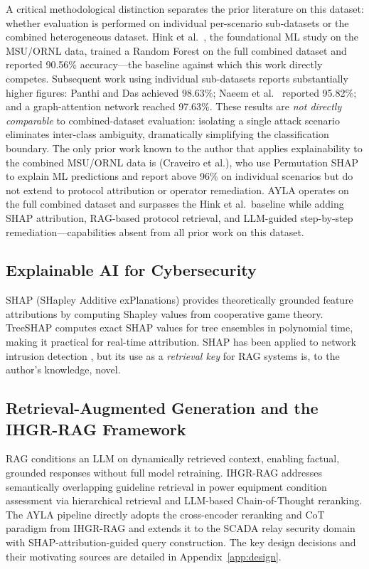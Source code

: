 \documentclass[twocolumn, 10pt, letterpaper]{article}
\begin{document}
A critical methodological distinction separates the prior literature on this
dataset: whether evaluation is performed on individual per-scenario sub-datasets
or the combined heterogeneous dataset.
Hink et al.\ \cite{hink2014ml}, the foundational ML study on the
MSU/ORNL data, trained a Random Forest on the full combined dataset and reported
90.56\% accuracy---the baseline against which this work directly competes.
Subsequent work using individual sub-datasets reports substantially higher figures:
Panthi and Das \cite{panthi2022ensemble} achieved 98.63\%; Naeem et al.\ \cite{naeem2025deep}
reported 95.82\%; and a graph-attention network \cite{graphkan2025} reached 97.63\%.
These results are \textit{not directly comparable} to combined-dataset evaluation:
isolating a single attack scenario eliminates inter-class ambiguity, dramatically
simplifying the classification boundary.
The only prior work known to the author that applies explainability to the combined
MSU/ORNL data is \cite{shapgrid2026} (Craveiro et al.), who use Permutation SHAP to explain
ML predictions and report above 96\% on individual scenarios but do not extend
to protocol attribution or operator remediation.
AYLA operates on the full combined dataset and surpasses the Hink et al.\ baseline
while adding SHAP attribution, RAG-based protocol retrieval, and LLM-guided
step-by-step remediation---capabilities absent from all prior work on this dataset.

\subsection{Explainable AI for Cybersecurity}

SHAP (SHapley Additive exPlanations) \cite{lundberg2017shap} provides
theoretically grounded feature attributions by computing Shapley values from
cooperative game theory.
TreeSHAP \cite{lundberg2020treeshap} computes exact SHAP values for
tree ensembles in polynomial time, making it practical for real-time attribution.
SHAP has been applied to network intrusion detection \cite{shap_ids}, but its
use as a \textit{retrieval key} for RAG systems is, to the author's knowledge, novel.

\subsection{Retrieval-Augmented Generation and the IHGR-RAG Framework}

RAG \cite{lewis2020rag} conditions an LLM on dynamically retrieved context,
enabling factual, grounded responses without full model retraining.
IHGR-RAG \cite{ihgrrag2025} addresses semantically overlapping guideline retrieval
in power equipment condition assessment via hierarchical retrieval and
LLM-based Chain-of-Thought reranking.
The AYLA pipeline directly adopts the cross-encoder reranking and CoT paradigm
from IHGR-RAG \cite{ihgrrag2025} and extends it to the SCADA relay security domain
with SHAP-attribution-guided query construction.
The key design decisions and their motivating sources are detailed in
Appendix~\ref{app:design}.
\end{document}
